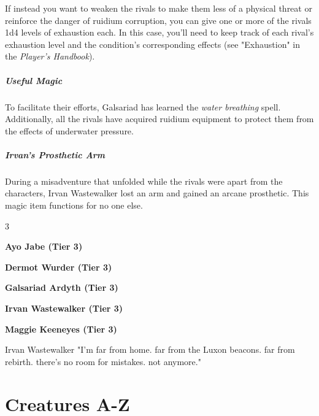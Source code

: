 \documentclass[10pt,a4paper,twoside,fancy,bg=print,twocolumn,openany,nodeprecatedcode]{dndbook}
\begin{document}
If instead you want to weaken the rivals to make them less of a physical threat or reinforce the danger of ruidium corruption, you can give one or more of the rivals 1d4 levels of exhaustion each. In this case, you'll need to keep track of each rival's exhaustion level and the condition's corresponding effects (see "Exhaustion" in the \textit{Player's Handbook}).

\subparagraph{Useful Magic}
To facilitate their efforts, Galsariad has learned the \textit{water breathing} spell. Additionally, all the rivals have acquired ruidium equipment to protect them from the effects of underwater pressure.

\subparagraph{Irvan's Prosthetic Arm}
During a misadventure that unfolded while the rivals were apart from the characters, Irvan Wastewalker lost an arm and gained an arcane prosthetic. This magic item functions for no one else.


\begin{itemize}
\begin{multicols}{3}
\item \textbf{Ayo Jabe (Tier 3)}
\item \textbf{Dermot Wurder (Tier 3)}
\item \textbf{Galsariad Ardyth (Tier 3)}
\item \textbf{Irvan Wastewalker (Tier 3)}
\item \textbf{Maggie Keeneyes (Tier 3)}
\end{multicols}

\end{itemize}

\begin{DndReadAloud}{Irvan Wastewalker}
"I'm far from home. far from the Luxon beacons. far from rebirth. there's no room for mistakes. not anymore."

\end{DndReadAloud}

\section{Creatures A-Z}
\end{document}
